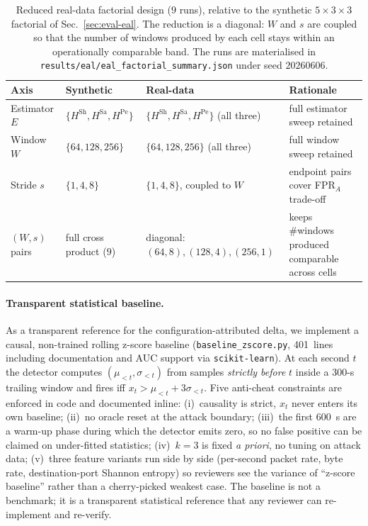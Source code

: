 \documentclass[futureinternet,article,submit,pdftex,moreauthors]{Definitions/mdpi}
\newcommand{\Hsh}{\ensuremath{H^{\mathrm{Sh}}}}
\newcommand{\Hsa}{\ensuremath{H^{\mathrm{Sa}}}}
\newcommand{\Hpe}{\ensuremath{H^{\mathrm{Pe}}}}
\begin{document}
\begin{table}[t]
\centering
\caption{Reduced real-data factorial design ($9$ runs), relative to the
synthetic $5 \times 3 \times 3$ factorial of
Sec.~\ref{sec:eval-eal}. The reduction is a diagonal:
$W$ and $s$ are coupled so that the number of windows produced by
each cell stays within an operationally comparable band. The runs
are materialised in \texttt{results/eal/eal\_factorial\_summary.json}
under seed $20260606$.}
\label{tab:real-factorial}
\small
\begin{tabular}{@{}llll@{}}
\toprule
\textbf{Axis} & \textbf{Synthetic} & \textbf{Real-data} & \textbf{Rationale} \\
\midrule
Estimator $E$   & $\{\Hsh, \Hsa, \Hpe\}$    & $\{\Hsh, \Hsa, \Hpe\}$ (all three) & full estimator sweep retained \\
Window $W$      & $\{64, 128, 256\}$        & $\{64, 128, 256\}$ (all three)     & full window sweep retained \\
Stride $s$      & $\{1, 4, 8\}$             & $\{1, 4, 8\}$, coupled to $W$      & endpoint pairs cover FPR$_A$ trade-off \\
$(W, s)$ pairs  & full cross product ($9$)  & diagonal: $(64,8), (128,4), (256,1)$ & keeps \#windows produced comparable across cells \\
\bottomrule
\end{tabular}
\end{table}

\paragraph{Transparent statistical baseline.} As a transparent reference
for the configuration-attributed delta, we implement a causal,
non-trained rolling z-score baseline (\texttt{baseline\_zscore.py},
401~lines including documentation and AUC support via
\texttt{scikit-learn}). At each second $t$ the detector
computes $(\mu_{<t}, \sigma_{<t})$ from samples \emph{strictly before}
$t$ inside a $300$-s trailing window and fires iff
$x_t > \mu_{<t} + 3\sigma_{<t}$. Five anti-cheat constraints are enforced
in code and documented inline: (i)~causality is strict, $x_t$ never
enters its own baseline; (ii)~no oracle reset at the attack boundary;
(iii)~the first $600$~s are a warm-up phase during which the detector
emits zero, so no false positive can be claimed on under-fitted
statistics; (iv)~$k=3$ is fixed \emph{a priori}, no tuning on attack
data; (v)~three feature variants run side by side (per-second packet
rate, byte rate, destination-port Shannon entropy) so reviewers see the
variance of ``z-score baseline'' rather than a cherry-picked weakest
case. The baseline is not a benchmark; it is a transparent statistical
reference that any reviewer can re-implement and re-verify.
\end{document}
